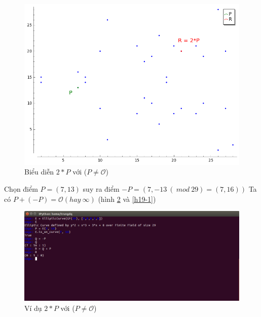 \documentclass[a4paper,12pt]{report}
\begin{document}
\begin{center}
\begin{figure}[H]
\includegraphics[width=0.8\linewidth]{../im14.png}
\caption{Biểu diễn $2*P$ với ($P \neq \mathcal{O}$)}
 \label{h14}
\end{figure}
\end{center}

Chọn điểm $P = (7, 13)$ suy ra điểm $-P = (7, -13 \ (\ mod \ 29 )= (7, 16))$ Ta có $P + (-P) = \mathcal{O}(hay \ \infty)$ (hình \ref{h19} và \ref{h19-1})

\begin{center}
\begin{figure}[H]
\includegraphics[width=0.9\linewidth]{../im19.png}
\caption{Ví dụ $2*P$ với ($P \neq \mathcal{O}$)} \label{h19}
\end{figure}
\end{center}
\end{document}
